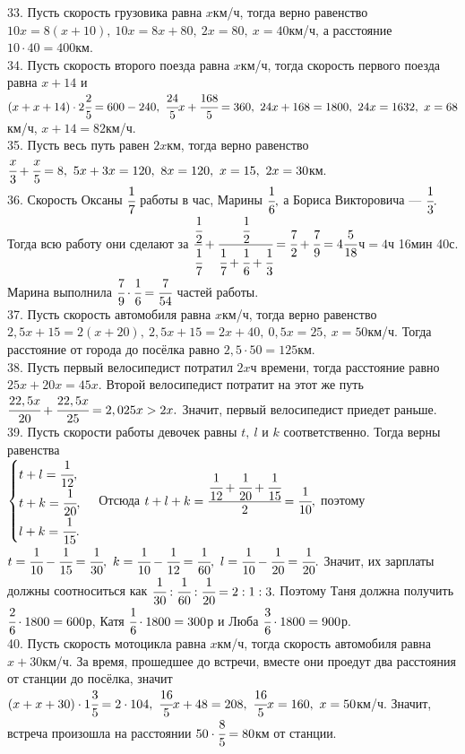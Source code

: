 \documentclass[12pt]{article}
\begin{document}
33. Пусть скорость грузовика равна $x$км/ч, тогда верно равенство $10x=8(x+10),\ 10x=8x+80,\ 2x=80,\ x=40$км/ч, а расстояние $10\cdot40=400$км.\\
34. Пусть скорость второго поезда равна $x$км/ч, тогда скорость первого поезда равна $x+14$ и $(x+x+14)\cdot2\cfrac{2}{5}=600-240,\ \cfrac{24}{5}x+\cfrac{168}{5}=360,\ 24x+168=1800,\ 24x=1632,\ x=68$км/ч, $x+14=82$км/ч.\\
35. Пусть весь путь равен $2x$км, тогда верно равенство $\cfrac{x}{3}+\cfrac{x}{5}=8,\ 5x+3x=120,\ 8x=120,\ x=15,\ 2x=30$км.\\
36. Скорость Оксаны $\cfrac{1}{7}$ работы в час, Марины $\cfrac{1}{6},$ а Бориса Викторовича --- $\cfrac{1}{3}.$ Тогда всю работу они сделают за $\cfrac{\cfrac{1}{2}}{\cfrac{1}{7}}+\cfrac{\cfrac{1}{2}}{\cfrac{1}{7}+\cfrac{1}{6}+\cfrac{1}{3}}=\cfrac{7}{2}+\cfrac{7}{9}=4\cfrac{5}{18}$ч$=4$ч 16мин 40с. Марина выполнила $\cfrac{7}{9}\cdot\cfrac{1}{6}=\cfrac{7}{54}$ частей работы.\\
37. Пусть скорость автомобиля равна $x$км/ч, тогда верно равенство $2,5x+15=2(x+20),\ 2,5x+15=2x+40,\ 0,5x=25,\ x=50$км/ч. Тогда расстояние от города до посёлка равно $2,5\cdot50=125$км.\\
38. Пусть первый велосипедист потратил $2x$ч времени, тогда расстояние равно $25x+20x=45x.$ Второй велосипедист потратит на этот же путь $\cfrac{22,5x}{20}+
\cfrac{22,5x}{25}=2,025x>2x.$ Значит, первый велосипедист приедет раньше.\\
39. Пусть скорости работы девочек равны $t,\ l$ и $k$ соответственно. Тогда верны равенства\\ $\begin{cases}t+l=\cfrac{1}{12},\\ t+k=\cfrac{1}{20},\\ l+k=\cfrac{1}{15}.\end{cases}$ Отсюда $t+l+k=\cfrac{\cfrac{1}{12}+\cfrac{1}{20}+\cfrac{1}{15}}{2}=\cfrac{1}{10},$ поэтому $t=\cfrac{1}{10}-\cfrac{1}{15}=\cfrac{1}{30},\ k=\cfrac{1}{10}-\cfrac{1}{12}=\cfrac{1}{60},\ l=\cfrac{1}{10}-\cfrac{1}{20}=\cfrac{1}{20}.$ Значит, их зарплаты должны соотноситься как $\cfrac{1}{30}:\cfrac{1}{60}:\cfrac{1}{20}=2:1:3.$ Поэтому Таня должна получить $\cfrac{2}{6}\cdot1800=600$р, Катя $\cfrac{1}{6}\cdot1800=300$р и Люба $\cfrac{3}{6}\cdot1800=900$р.\\
40. Пусть скорость мотоцикла равна $x$км/ч, тогда скорость автомобиля равна $x+30$км/ч. За время, прошедшее до встречи, вместе они проедут два расстояния от станции до посёлка, значит $(x+x+30)\cdot1\cfrac{3}{5}=2\cdot104,\ \cfrac{16}{5}x+48=208,\ \cfrac{16}{5}x=160,\ x=50$км/ч. Значит, встреча произошла на расстоянии $50\cdot\cfrac{8}{5}=80$км от станции. \\
\end{document}

